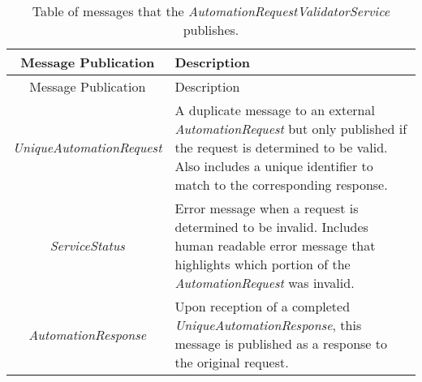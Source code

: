 \begin{longtable}[]{@{}cl@{}}
\caption{Table of messages that the
\emph{AutomationRequestValidatorService} publishes.}\tabularnewline
\toprule
\begin{minipage}[b]{0.4\columnwidth}\centering\strut
Message Publication\strut
\end{minipage} & \begin{minipage}[b]{0.55\columnwidth}\raggedright\strut
Description\strut
\end{minipage}\tabularnewline
\midrule
\endfirsthead
\toprule
\begin{minipage}[b]{0.4\columnwidth}\centering\strut
Message Publication\strut
\end{minipage} & \begin{minipage}[b]{0.55\columnwidth}\raggedright\strut
Description\strut
\end{minipage}\tabularnewline
\midrule
\endhead
\begin{minipage}[t]{0.4\columnwidth}\centering\strut
\emph{UniqueAutomationRequest}\strut
\end{minipage} & \begin{minipage}[t]{0.55\columnwidth}\raggedright\strut
A duplicate message to an external \emph{AutomationRequest} but only
published if the request is determined to be valid. Also includes a
unique identifier to match to the corresponding response.\strut
\end{minipage}\tabularnewline
\begin{minipage}[t]{0.4\columnwidth}\centering\strut
\emph{ServiceStatus}\strut
\end{minipage} & \begin{minipage}[t]{0.55\columnwidth}\raggedright\strut
Error message when a request is determined to be invalid. Includes human
readable error message that highlights which portion of the
\emph{AutomationRequest} was invalid.\strut
\end{minipage}\tabularnewline
\begin{minipage}[t]{0.4\columnwidth}\centering\strut
\emph{AutomationResponse}\strut
\end{minipage} & \begin{minipage}[t]{0.55\columnwidth}\raggedright\strut
Upon reception of a completed \emph{UniqueAutomationResponse}, this
message is published as a response to the original request.\strut
\end{minipage}\tabularnewline
\bottomrule
\end{longtable}

